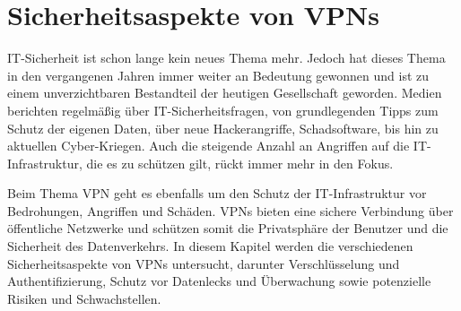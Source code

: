 \chapter{Sicherheitsaspekte von \gls{VPN}s} \label{sicherheitsaspekte}

IT-Sicherheit ist schon lange kein neues Thema mehr. Jedoch hat dieses Thema in den vergangenen Jahren immer weiter an Bedeutung gewonnen und ist zu einem unverzichtbaren Bestandteil der heutigen Gesellschaft geworden. Medien berichten regelmäßig über IT-Sicherheitsfragen, von grundlegenden Tipps zum Schutz der eigenen Daten, über neue Hackerangriffe, Schadsoftware, bis hin zu aktuellen Cyber-Kriegen. Auch die steigende Anzahl an Angriffen auf die IT-Infrastruktur, die es zu schützen gilt, rückt immer mehr in den Fokus. \cite{BSILagebericht2023}

Beim Thema \gls{VPN} geht es ebenfalls um den Schutz der IT-Infrastruktur vor Bedrohungen, Angriffen und Schäden. \gls{VPN}s bieten eine sichere Verbindung über öffentliche Netzwerke und schützen somit die Privatsphäre der Benutzer und die Sicherheit des Datenverkehrs. In diesem Kapitel werden die verschiedenen Sicherheitsaspekte von \gls{VPN}s untersucht, darunter Verschlüsselung und Authentifizierung, Schutz vor Datenlecks und Überwachung sowie potenzielle Risiken und Schwachstellen.